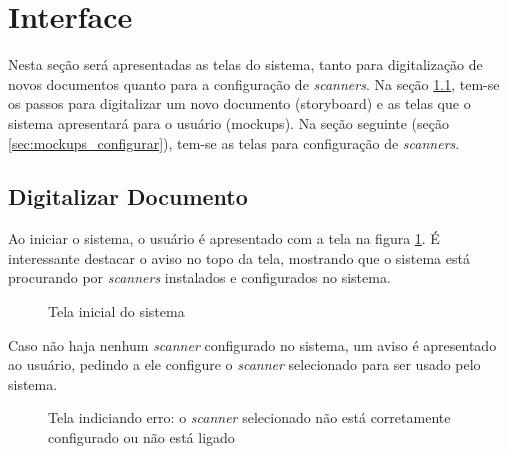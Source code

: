 \section{Interface}
\label{sec:mockups}

Nesta seção será apresentadas as telas do sistema, tanto para digitalização de novos documentos quanto para a configuração de {\it scanners}. Na seção \ref{sec:mockups_digitalizar}, tem-se os passos para digitalizar um novo documento (storyboard) e as telas que o sistema apresentará para o usuário (mockups). Na seção seguinte (seção \ref{sec:mockups_configurar}), tem-se as telas para configuração de {\it scanners}.

\subsection{Digitalizar Documento}
\label{sec:mockups_digitalizar}

Ao iniciar o sistema, o usuário é apresentado com a tela na figura \ref{fig:dig_1}. É interessante destacar o aviso no topo da tela, mostrando que o sistema está procurando por {\it scanners} instalados e configurados no sistema.

\begin{figure}[h]
 \centering
    \setlength\fboxsep{0pt}
    \setlength\fboxrule{0.5pt}
  \caption {Tela inicial do sistema}
  \label{fig:dig_1}
\end{figure}

Caso não haja nenhum {\it scanner} configurado no sistema, um aviso é apresentado ao usuário, pedindo a ele configure o {\it scanner} selecionado para ser usado pelo sistema.

\begin{figure}[h]
 \centering
    \setlength\fboxsep{0pt}
    \setlength\fboxrule{0.5pt}
  \caption {Tela indiciando erro: o {\it scanner} selecionado não está corretamente configurado ou não está ligado}
  \label{fig:dig_2}
\end{figure}

